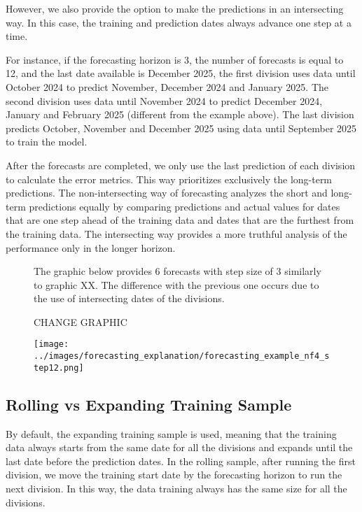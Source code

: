 However, we also provide the option to make the predictions in an intersecting way. In this case, the training and prediction dates always advance one step at a time.

For instance, if the forecasting horizon is 3, the number of forecasts is equal to 12, and the last date available is December 2025, the first division uses data until October 2024 to predict November, December 2024 and January 2025. The second division uses data until November 2024 to predict December 2024, January and February 2025 (different from the example above). The last division predicts October, November and December 2025 using data until September 2025 to train the model.

After the forecasts are completed, we only use the last prediction of each division to calculate the error metrics. This way prioritizes exclusively the long-term predictions. The non-intersecting way of forecasting analyzes the short and long-term predictions equally by comparing predictions and actual values for dates that are one step ahead of the training data and dates that are the furthest from the training data. The intersecting way provides a more truthful analysis of the performance only in the longer horizon.

\begin{figure}[H]
    The graphic below provides 6 forecasts with step size of 3 similarly to graphic XX. The difference with the previous one occurs due to the use of intersecting dates of the divisions.

    CHANGE GRAPHIC
    \begin{center}
        \texttt{[image: ../images/forecasting\_explanation/forecasting\_example\_nf4\_step12.png]}
    \end{center}
\end{figure}

\subsection{Rolling vs Expanding Training Sample}

By default, the expanding training sample is used, meaning that the training data always starts from the same date for all the divisions and expands until the last date before the prediction dates. In the rolling sample, after running the first division, we move the training start date by the forecasting horizon to run the next division. In this way, the data training always has the same size for all the divisions.
